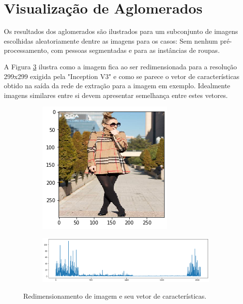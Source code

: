 \documentclass[12pt]{report}
\begin{document}
\section{Visualização de Aglomerados}

Os resultados dos aglomerados são ilustrados para um subconjunto de imagens escolhidas aleatoriamente dentre as imagens para os casos: Sem nenhum pré-processamento, com pessoas segmentadas e para as instâncias de roupas. 

A Figura \ref{fig:originais} ilustra como a imagem fica ao ser redimensionada para a resolução 299x299 exigida pela "Inception V3" e como se parece o vetor de características obtido na saída da rede de extração para a imagem em exemplo. Idealmente imagens similares entre si devem apresentar semelhança entre estes vetores.

\begin{figure}
  \centering
  \begin{subfigure}[b]{\textwidth}
  \centering
    \includegraphics[scale=0.7]{images/resultados/299206menor.png}
    \label{fig:}
  \end{subfigure}
  \centering
  \begin{subfigure}[b]{\textwidth}
  \centering
    \includegraphics[scale=0.45]{images/resultados/299206feat.png}
    \label{fig:}
  \end{subfigure}
  \caption{Redimensionamento de imagem e seu vetor de características.}
  \label{fig:originais}
\end{figure}
\end{document}
